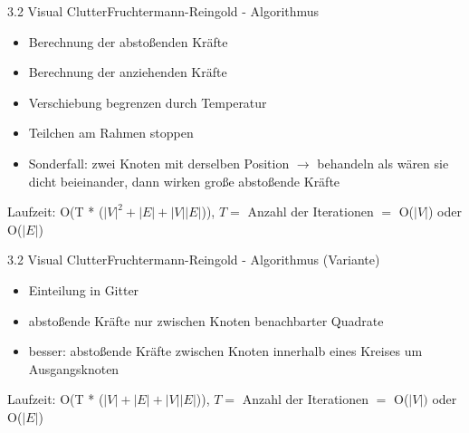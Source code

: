 \documentclass[%
11pt,a4paper,xcolor={usenames,dvipsnames}]{beamer}
\begin{document}
    \begin{frame}{3.2 Visual Clutter}{Fruchtermann-Reingold - Algorithmus}
        \begin{itemize}
        	\item Berechnung der abstoßenden Kräfte
	        \item Berechnung der anziehenden Kräfte
	        \item Verschiebung begrenzen durch Temperatur
	        \item Teilchen am Rahmen stoppen
	        \item Sonderfall: zwei Knoten mit derselben Position $\rightarrow$ behandeln als wären sie dicht beieinander, dann wirken große abstoßende Kräfte
    	\end{itemize}

    	Laufzeit: O(T * ($|V|^2 + |E| + |V||E|$)), $T =$ Anzahl der Iterationen $=$ O($|V|$) oder O($|E|$)
    \end{frame}

    \begin{frame}{3.2 Visual Clutter}{Fruchtermann-Reingold - Algorithmus (Variante)}
        \begin{itemize}
        	\item Einteilung in Gitter
        	\item abstoßende Kräfte nur zwischen Knoten benachbarter Quadrate
        	\item besser: abstoßende Kräfte zwischen Knoten innerhalb eines Kreises um Ausgangsknoten
    	\end{itemize}

    	Laufzeit: O(T * ($|V| + |E| + |V||E|$)), $T =$ Anzahl der Iterationen $=$ O($|V|)$ oder O($|E|$)
    \end{frame}
\end{document}
